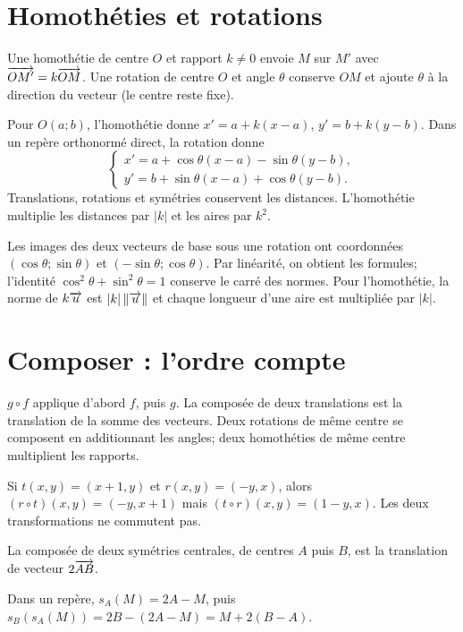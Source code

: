 \section{Homothéties et rotations}
\begin{definition}Une homothétie de centre $O$ et rapport $k\ne0$ envoie $M$ sur $M'$ avec $\overrightarrow{OM'}=k\overrightarrow{OM}$. Une rotation de centre $O$ et angle $\theta$ conserve $OM$ et ajoute $\theta$ à la direction du vecteur (le centre reste fixe).\end{definition}
\begin{propriete}Pour $O(a;b)$, l’homothétie donne $x'=a+k(x-a)$, $y'=b+k(y-b)$. Dans un repère orthonormé direct, la rotation donne
\[
\begin{cases}x'=a+\cos\theta(x-a)-\sin\theta(y-b),\\
y'=b+\sin\theta(x-a)+\cos\theta(y-b).
\end{cases}
\]
Translations, rotations et symétries conservent les distances. L’homothétie multiplie les distances par $|k|$ et les aires par $k^2$.
\end{propriete}
\begin{demonstration}Les images des deux vecteurs de base sous une rotation ont coordonnées $(\cos\theta;\sin\theta)$ et $(-\sin\theta;\cos\theta)$. Par linéarité, on obtient les formules; l’identité $\cos^2\theta+\sin^2\theta=1$ conserve le carré des normes. Pour l’homothétie, la norme de $k\overrightarrow{u}$ est $|k|\left\lVert \overrightarrow{u} \right\rVert$ et chaque longueur d’une aire est multipliée par $|k|$.\end{demonstration}
\section{Composer : l’ordre compte}
\begin{definition}$g\circ f$ applique d’abord $f$, puis $g$. La composée de deux translations est la translation de la somme des vecteurs. Deux rotations de même centre se composent en additionnant les angles; deux homothéties de même centre multiplient les rapports.\end{definition}
\begin{exemple}Si $t(x,y)=(x+1,y)$ et $r(x,y)=(-y,x)$, alors $(r\circ t)(x,y)=(-y,x+1)$ mais $(t\circ r)(x,y)=(1-y,x)$. Les deux transformations ne commutent pas.\end{exemple}
\begin{propriete}La composée de deux symétries centrales, de centres $A$ puis $B$, est la translation de vecteur $2\overrightarrow{AB}$.\end{propriete}
\begin{demonstration}Dans un repère, $s_A(M)=2A-M$, puis $s_B(s_A(M))=2B-(2A-M)=M+2(B-A)$.\end{demonstration}
